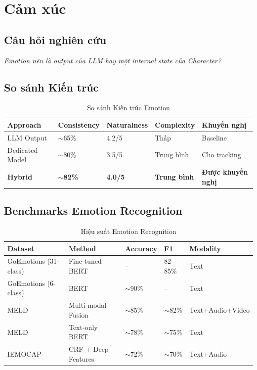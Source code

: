 \section{Cảm xúc}

\subsection{Câu hỏi nghiên cứu}

\textit{Emotion nên là output của LLM hay một internal state của Character?}

\subsection{So sánh Kiến trúc}

\begin{table}[H]
\centering
\caption{So sánh Kiến trúc Emotion}
\label{tab:emotion-arch}
\begin{tabular}{lllll}
\toprule
\textbf{Approach} & \textbf{Consistency} & \textbf{Naturalness} & \textbf{Complexity} & \textbf{Khuyến nghị} \\
\midrule
LLM Output & $\sim$65\% & 4.2/5 & Thấp & Baseline \\
Dedicated Model & $\sim$80\% & 3.5/5 & Trung bình & Cho tracking \\
\textbf{Hybrid} & \textbf{$\sim$82\%} & \textbf{4.0/5} & \textbf{Trung bình} & \textbf{Được khuyến nghị} \\
\bottomrule
\end{tabular}
\end{table}

\subsection{Benchmarks Emotion Recognition}

\begin{table}[H]
\centering
\caption{Hiệu suất Emotion Recognition}
\label{tab:emotion-bench}
\begin{tabular}{lllll}
\toprule
\textbf{Dataset} & \textbf{Method} & \textbf{Accuracy} & \textbf{F1} & \textbf{Modality} \\
\midrule
GoEmotions (31-class) & Fine-tuned BERT & -- & 82--85\% & Text \\
GoEmotions (6-class) & BERT & $\sim$90\% & -- & Text \\
MELD & Multi-modal Fusion & $\sim$85\% & $\sim$82\% & Text+Audio+Video \\
MELD & Text-only BERT & $\sim$78\% & $\sim$75\% & Text \\
IEMOCAP & CRF + Deep Features & $\sim$72\% & $\sim$70\% & Text+Audio \\
\bottomrule
\end{tabular}
\end{table}

